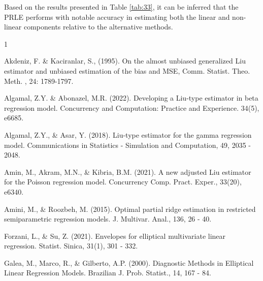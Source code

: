 \documentclass{article}
\begin{document}
Based on the results presented in Table \ref{tab:33}, it can be inferred that the PRLE performs with notable accuracy in estimating both the linear and non-linear components relative to the alternative methods.


\begin{thebibliography}{1}
	
Akdeniz, F. \& Kaciranlar, S., (1995). On the almost unbiased generalized Liu estimator and unbiased estimation of the bias and MSE, Comm. Statist. Theo. Meth. , 24: 1789-1797.

Algamal, Z.Y. \& Abonazel, M.R. (2022). Developing a Liu-type estimator in beta regression model. Concurrency and Computation: Practice and Experience. 34(5), e6685.

Algamal, Z.Y., \& Asar, Y. (2018). Liu-type estimator for the gamma regression model. Communications in Statistics - Simulation and Computation, 49, 2035 - 2048.

Amin, M., Akram, M.N., \& Kibria, B.M. (2021). A new adjusted Liu estimator for the Poisson regression model. Concurrency Comp. Pract. Exper., {\color{black}33(20), e6340.}

Amini, M., \& Roozbeh, M. (2015). Optimal partial ridge estimation in restricted semiparametric regression models. J. Multivar. Anal., 136, {\color{black}26 - 40.}


Forzani, L., \& Su, Z. (2021). Envelopes for elliptical multivariate linear regression. Statist. Sinica, 31(1), 301 - 332.

Galea, M., Marco, R., \& Gilberto, A.P. (2000). Diagnostic Methods in Elliptical Linear Regression Models. Brazilian J. Prob. Statist., 14, 167 - 84.


		

\end{thebibliography}
\end{document}
